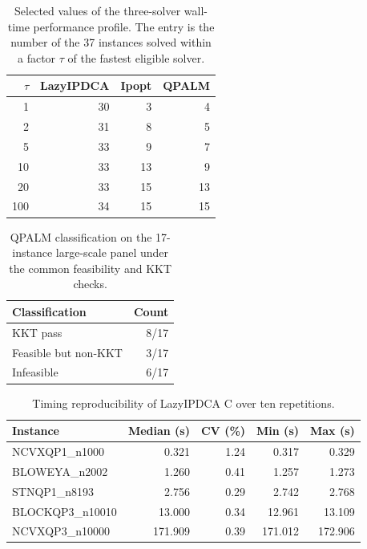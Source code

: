 \begin{table}[t]
\centering
\caption{Selected values of the three-solver wall-time performance profile. The entry is the number of the 37 instances solved within a factor $\tau$ of the fastest eligible solver.}
\label{tab:performance-profile-selected}
\begin{tabular}{rrrr}
\toprule
$\tau$ & LazyIPDCA & Ipopt & QPALM\\
\midrule
1   & 30 & 3  & 4\\
2   & 31 & 8  & 5\\
5   & 33 & 9  & 7\\
10  & 33 & 13 & 9\\
20  & 33 & 15 & 13\\
100 & 34 & 15 & 15\\
\bottomrule
\end{tabular}
\end{table}

\begin{table}[t]
\centering
\caption{QPALM classification on the 17-instance large-scale panel under the common feasibility and KKT checks.}
\label{tab:qpalm-xl17-summary}
\begin{tabular}{lr}
\toprule
Classification & Count\\
\midrule
KKT pass & 8/17\\
Feasible but non-KKT & 3/17\\
Infeasible & 6/17\\
\bottomrule
\end{tabular}
\end{table}

\begin{table}[t]
\centering
\caption{Timing reproducibility of LazyIPDCA C over ten repetitions.}
\label{tab:timing-reproducibility}
\begin{tabular}{lrrrr}
\toprule
Instance & Median (s) & CV (\%) & Min (s) & Max (s)\\
\midrule
NCVXQP1\_n1000   & 0.321 & 1.24 & 0.317 & 0.329\\
BLOWEYA\_n2002   & 1.260 & 0.41 & 1.257 & 1.273\\
STNQP1\_n8193    & 2.756 & 0.29 & 2.742 & 2.768\\
BLOCKQP3\_n10010 & 13.000 & 0.34 & 12.961 & 13.109\\
NCVXQP3\_n10000  & 171.909 & 0.39 & 171.012 & 172.906\\
\bottomrule
\end{tabular}
\end{table}
